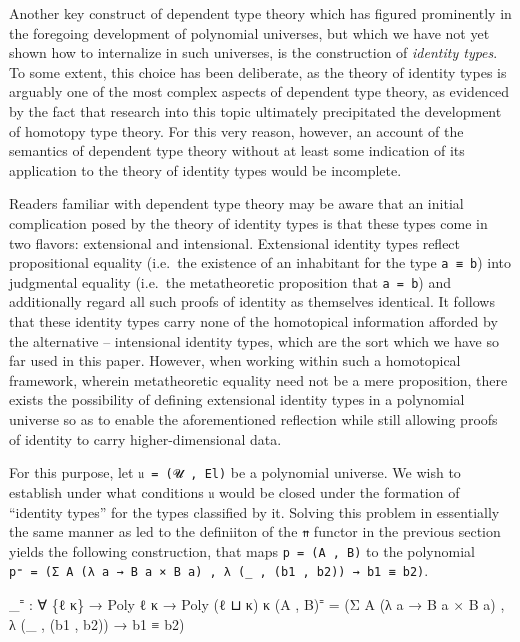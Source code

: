 \documentclass[
  11pt,
  oneside,
  article]{memoir}
\newenvironment{Shaded}{}{}
\newcommand{\NormalTok}[1]{#1}
\newcommand{\OtherTok}[1]{\textcolor[rgb]{0.00,0.44,0.13}{#1}}
\theoremstyle{definition}
\theoremstyle{plain}
\newcommand{\0}{\textsf{0}}
\newcommand{\1}{\tn{\textsf{1}}}
\begin{document}
Another key construct of dependent type theory which has figured
prominently in the foregoing development of polynomial universes, but
which we have not yet shown how to internalize in such universes, is the
construction of \emph{identity types}. To some extent, this choice has
been deliberate, as the theory of identity types is arguably one of the
most complex aspects of dependent type theory, as evidenced by the fact
that research into this topic ultimately precipitated the development of
homotopy type theory. For this very reason, however, an account of the
semantics of dependent type theory without at least some indication of
its application to the theory of identity types would be incomplete.

Readers familiar with dependent type theory may be aware that an initial
complication posed by the theory of identity types is that these types
come in two flavors: extensional and intensional. Extensional identity
types reflect propositional equality (i.e.~the existence of an
inhabitant for the type \texttt{a\ ≡\ b}) into judgmental equality
(i.e.~the metatheoretic proposition that \texttt{a\ =\ b}) and
additionally regard all such proofs of identity as themselves identical.
It follows that these identity types carry none of the homotopical
information afforded by the alternative -- intensional identity types,
which are the sort which we have so far used in this paper. However,
when working within such a homotopical framework, wherein metatheoretic
equality need not be a mere proposition, there exists the possibility of
defining extensional identity types in a polynomial universe so as to
enable the aforementioned reflection while still allowing proofs of
identity to carry higher-dimensional data.

For this purpose, let \texttt{𝔲\ =\ (𝓤\ ,\ El)} be a polynomial
universe. We wish to establish under what conditions \texttt{𝔲} would be
closed under the formation of ``identity types'' for the types
classified by it. Solving this problem in essentially the same manner as
led to the definiiton of the \texttt{⇈} functor in the previous section
yields the following construction, that maps \texttt{p\ =\ (A\ ,\ B)} to
the polynomial
\texttt{p⁼\ =\ (Σ\ A\ (λ\ a\ →\ B\ a\ ×\ B\ a)\ ,\ λ\ (\_\ ,\ (b1\ ,\ b2))\ →\ b1\ ≡\ b2)}.

\begin{Shaded}
\begin{Highlighting}[]
\OtherTok{\_}\NormalTok{⁼ }\OtherTok{:} \OtherTok{∀} \OtherTok{\{}\NormalTok{ℓ κ}\OtherTok{\}} \OtherTok{→}\NormalTok{ Poly ℓ κ }\OtherTok{→}\NormalTok{ Poly }\OtherTok{(}\NormalTok{ℓ ⊔ κ}\OtherTok{)}\NormalTok{ κ}
\OtherTok{(}\NormalTok{A , B}\OtherTok{)}\NormalTok{⁼ }\OtherTok{=} \OtherTok{(}\NormalTok{Σ A }\OtherTok{(λ}\NormalTok{ a }\OtherTok{→}\NormalTok{ B a × B a}\OtherTok{)}\NormalTok{ , }\OtherTok{λ} \OtherTok{(\_}\NormalTok{ , }\OtherTok{(}\NormalTok{b1 , b2}\OtherTok{))} \OtherTok{→}\NormalTok{ b1 ≡ b2}\OtherTok{)}
\end{Highlighting}
\end{Shaded}
\end{document}
